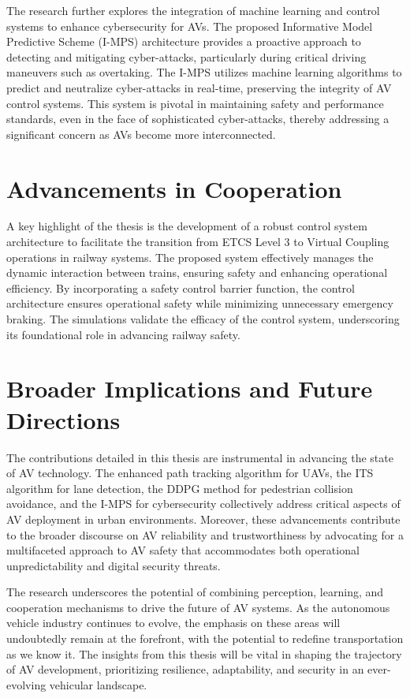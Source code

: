 The research further explores the integration of machine learning and control systems to enhance cybersecurity for AVs. The proposed Informative Model Predictive Scheme (I-MPS) architecture provides a proactive approach to detecting and mitigating cyber-attacks, particularly during critical driving maneuvers such as overtaking. The I-MPS utilizes machine learning algorithms to predict and neutralize cyber-attacks in real-time, preserving the integrity of AV control systems. This system is pivotal in maintaining safety and performance standards, even in the face of sophisticated cyber-attacks, thereby addressing a significant concern as AVs become more interconnected.

\section*{Advancements in Cooperation}

A key highlight of the thesis is the development of a robust control system architecture to facilitate the transition from ETCS Level 3 to Virtual Coupling operations in railway systems. The proposed system effectively manages the dynamic interaction between trains, ensuring safety and enhancing operational efficiency. By incorporating a safety control barrier function, the control architecture ensures operational safety while minimizing unnecessary emergency braking. The simulations validate the efficacy of the control system, underscoring its foundational role in advancing railway safety.

\section{Broader Implications and Future Directions}

The contributions detailed in this thesis are instrumental in advancing the state of AV technology. The enhanced path tracking algorithm for UAVs, the ITS algorithm for lane detection, the DDPG method for pedestrian collision avoidance, and the I-MPS for cybersecurity collectively address critical aspects of AV deployment in urban environments. Moreover, these advancements contribute to the broader discourse on AV reliability and trustworthiness by advocating for a multifaceted approach to AV safety that accommodates both operational unpredictability and digital security threats.

The research underscores the potential of combining perception, learning, and cooperation mechanisms to drive the future of AV systems. As the autonomous vehicle industry continues to evolve, the emphasis on these areas will undoubtedly remain at the forefront, with the potential to redefine transportation as we know it. The insights from this thesis will be vital in shaping the trajectory of AV development, prioritizing resilience, adaptability, and security in an ever-evolving vehicular landscape.


